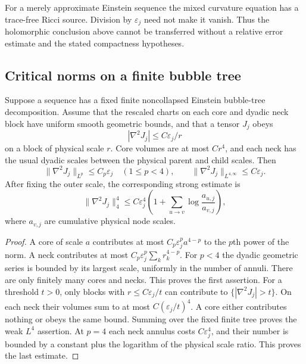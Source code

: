 For a merely approximate Einstein sequence the mixed curvature
equation has a trace-free Ricci source.  Division by
$\varepsilon_j$ need not make it vanish.  Thus the holomorphic
conclusion above cannot be transferred without a relative error
estimate and the stated compactness hypotheses.

\subsection{Critical norms on a finite bubble tree}

\begin{lemma}
\label{lem:eqg-tree}
Suppose a sequence has a fixed finite noncollapsed Einstein bubble-tree
decomposition.  Assume that the rescaled charts on each core and
dyadic neck block have uniform smooth geometric bounds, and that a
tensor $J_j$ obeys
\[
 |\nabla^2J_j|\leq C\varepsilon_j/r
\]
on a block of physical scale $r$.  Core volumes are at most $Cr^4$,
and each neck has the usual dyadic scales between the physical
parent and child scales.  Then
\begin{equation}\label{eq:eqg-tree}
 \|\nabla^2J_j\|_{L^p}\leq C_p\varepsilon_j\quad(1\leq p<4),
 \qquad
 \|\nabla^2J_j\|_{L^{4,\infty}}\leq C\varepsilon_j.
\end{equation}
After fixing the outer scale, the corresponding strong estimate is
\[
 \|\nabla^2J_j\|_4^4
 \leq C\varepsilon_j^4
 \left(1+\sum_{u\to v}\log\frac{a_{u,j}}{a_{v,j}}\right),
\]
where $a_{v,j}$ are cumulative physical node scales.
\end{lemma}

\begin{proof}
A core of scale $a$ contributes at most
$C_p\varepsilon_j^pa^{4-p}$ to the $p$th power of the norm.
A neck contributes at most
$C_p\varepsilon_j^p\sum_k r_k^{4-p}$.
For $p<4$ the dyadic geometric series is bounded by its largest
scale, uniformly in the number of annuli.  There are only finitely
many cores and necks.  This proves the first assertion.
For a threshold $t>0$, only blocks with $r\leq C\varepsilon_j/t$
can contribute to $\{|\nabla^2J_j|>t\}$.
On each neck their volumes sum to at most
$C(\varepsilon_j/t)^4$.  A core either contributes nothing or obeys
the same bound.  Summing over the fixed finite tree proves the weak
$L^4$ assertion.  At $p=4$ each neck annulus costs
$C\varepsilon_j^4$, and their number is bounded by a constant plus
the logarithm of the physical scale ratio.  This proves the last
estimate.
\end{proof}

